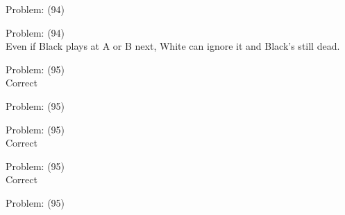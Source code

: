 \documentclass[11pt]{article}
\begin{document}
\begin{minipage}[t]{0.5\textwidth}
  {\centering
  
  Problem: (94)\\
  
  }
\end{minipage}
\begin{minipage}[t]{0.5\textwidth}
  {\centering
  
  Problem: (94)\\
  Even if Black plays at A or B next, White can ignore it and Black's still dead.\\
  }
\end{minipage}
\begin{minipage}[t]{0.5\textwidth}
  {\centering
  
  Problem: (95)\\
  Correct\\
  }
\end{minipage}
\begin{minipage}[t]{0.5\textwidth}
  {\centering
  
  Problem: (95)\\
  
  }
\end{minipage}
\begin{minipage}[t]{0.5\textwidth}
  {\centering
  
  Problem: (95)\\
  Correct\\
  }
\end{minipage}
\begin{minipage}[t]{0.5\textwidth}
  {\centering
  
  Problem: (95)\\
  Correct\\
  }
\end{minipage}
\begin{minipage}[t]{0.5\textwidth}
  {\centering
  
  Problem: (95)\\
  
  }
\end{minipage}
\end{document}
